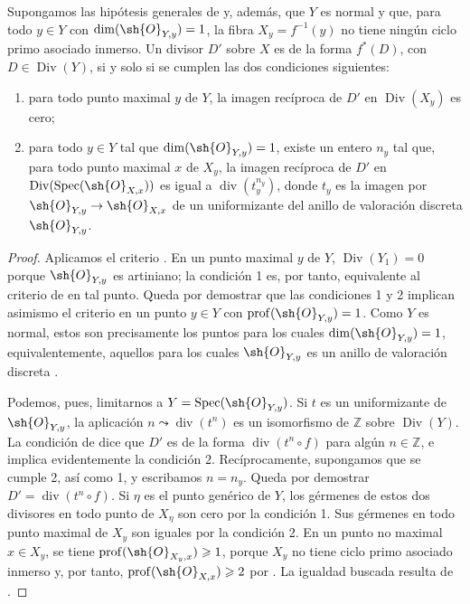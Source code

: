 \begin{corollary}[21.4.10]
\ifdefined\EGAIVSuppressErratumLabels\else\label{IV.21.4.10}\fi
Supongamos las hipótesis generales de {} y, además, que
$Y$ es normal y que, para todo $y\in Y$ con
$\dim(\sh{O}_{Y,y})=1$, la fibra $X_y=f^{-1}(y)$ no tiene ningún
ciclo primo asociado inmerso. Un divisor $D'$ sobre $X$ es de la forma $f^*(D)$,
con $D\in\operatorname{Div}(Y)$, si y solo si se cumplen las dos
condiciones siguientes:
\begin{enumerate}[label=\textup{\arabic*\textdegree}]
\item para todo punto maximal $y$ de $Y$, la imagen recíproca de $D'$ en
$\operatorname{Div}(X_y)$ es cero;
\item para todo $y\in Y$ tal que $\dim(\sh{O}_{Y,y})=1$, existe un
entero $n_y$ tal que, para todo punto maximal $x$ de $X_y$, la
imagen recíproca de $D'$ en
$\operatorname{Div}(\operatorname{Spec}(\sh{O}_{X,x}))$ es igual a
$\operatorname{div}(t_y^{n_y})$, donde $t_y$ es la imagen por
$\sh{O}_{Y,y}\to\sh{O}_{X,x}$ de un uniformizante del anillo de
valoración discreta $\sh{O}_{Y,y}$.
\end{enumerate}
\end{corollary}

\begin{proof}
Aplicamos el criterio {}. En un punto maximal $y$ de $Y$,
$\operatorname{Div}(Y_1)=0$ porque $\sh{O}_{Y,y}$ es artiniano;
la condición 1\textdegree{} es, por tanto, equivalente al criterio de
{} en tal punto. Queda por demostrar que las condiciones
1\textdegree{} y 2\textdegree{} implican asimismo el criterio en un
punto $y\in Y$ con $\operatorname{prof}(\sh{O}_{Y,y})=1$. Como $Y$
es normal, estos son precisamente los puntos para los cuales
$\dim(\sh{O}_{Y,y})=1$, equivalentemente, aquellos para los cuales
$\sh{O}_{Y,y}$ es un anillo de valoración discreta {}.

Podemos, pues, limitarnos a $Y=\operatorname{Spec}(\sh{O}_{Y,y})$. Si $t$
es un uniformizante de $\sh{O}_{Y,y}$, la aplicación
$n\leadsto\operatorname{div}(t^n)$ es un isomorfismo de $\mathbb Z$
sobre $\operatorname{Div}(Y)$. La condición de {} dice que
$D'$ es de la forma $\operatorname{div}(t^n\circ f)$ para algún
$n\in\mathbb Z$, e implica evidentemente la condición 2\textdegree{}.
Recíprocamente, supongamos que se cumple 2\textdegree{}, así como 1\textdegree{}, y
escribamos $n=n_y$. Queda por demostrar
$D'=\operatorname{div}(t^n\circ f)$. Si $\eta$ es el punto genérico de
$Y$, los gérmenes de estos dos divisores en todo punto de $X_\eta$ son
cero por la condición 1\textdegree{}. Sus gérmenes en todo punto maximal
de $X_y$ son iguales por la condición 2\textdegree{}. En un punto no maximal
$x\in X_y$, se tiene
$\operatorname{prof}(\sh{O}_{X_y,x})\geq 1$, porque $X_y$ no tiene
ciclo primo asociado inmerso y, por tanto,
$\operatorname{prof}(\sh{O}_{X,x})\geq 2$ por {}. La
igualdad buscada resulta de {}.
\end{proof}

